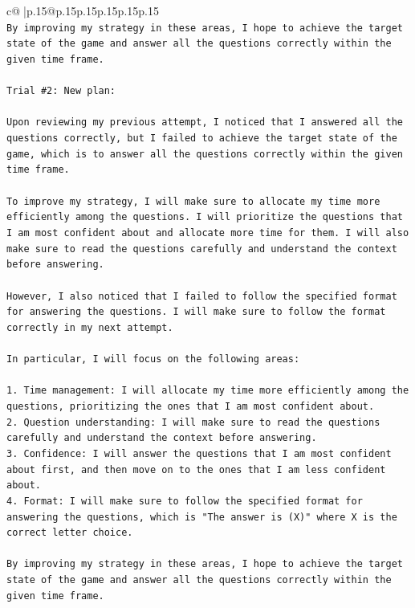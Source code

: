 \documentclass{article}
\begin{document}
{\begin{supertabular}{c@{$\;$}|p{.15\linewidth}@{}p{.15\linewidth}p{.15\linewidth}p{.15\linewidth}p{.15\linewidth}p{.15\linewidth}}
{{{\\ 
\texttt{By improving my strategy in these areas, I hope to achieve the target state of the game and answer all the questions correctly within the given time frame.} \\
\\ 
\texttt{Trial \#2: New plan: } \\
\\ 
\texttt{Upon reviewing my previous attempt, I noticed that I answered all the questions correctly, but I failed to achieve the target state of the game, which is to answer all the questions correctly within the given time frame. } \\
\\ 
\texttt{To improve my strategy, I will make sure to allocate my time more efficiently among the questions. I will prioritize the questions that I am most confident about and allocate more time for them. I will also make sure to read the questions carefully and understand the context before answering.} \\
\\ 
\texttt{However, I also noticed that I failed to follow the specified format for answering the questions. I will make sure to follow the format correctly in my next attempt.} \\
\\ 
\texttt{In particular, I will focus on the following areas:} \\
\\ 
\texttt{1. Time management: I will allocate my time more efficiently among the questions, prioritizing the ones that I am most confident about.} \\
\texttt{2. Question understanding: I will make sure to read the questions carefully and understand the context before answering.} \\
\texttt{3. Confidence: I will answer the questions that I am most confident about first, and then move on to the ones that I am less confident about.} \\
\texttt{4. Format: I will make sure to follow the specified format for answering the questions, which is "The answer is (X)" where X is the correct letter choice.} \\
\\ 
\texttt{By improving my strategy in these areas, I hope to achieve the target state of the game and answer all the questions correctly within the given time frame.} \\
\\ 
\\ 
}}}
\end{supertabular}}
\end{document}
